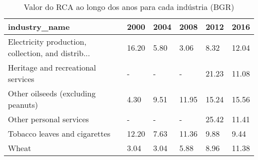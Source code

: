 \begin{table}
\centering
\caption{Valor do RCA ao longo dos anos para cada indústria (BGR)}
\begin{tabular}{p{6cm}p{1.5cm}p{1.5cm}p{1.5cm}p{1.5cm}p{1.5cm}}
\toprule
                                     industry\_name &  2000 & 2004 &  2008 &  2012 &  2016 \\
\midrule
Electricity production, collection, and distrib... & 16.20 & 5.80 &  3.06 &  8.32 & 12.04 \\
                Heritage and recreational services &     - &    - &     - & 21.23 & 11.08 \\
                Other oilseeds (excluding peanuts) &  4.30 & 9.51 & 11.95 & 15.24 & 15.56 \\
                           Other personal services &     - &    - &     - & 25.42 & 11.41 \\
                     Tobacco leaves and cigarettes & 12.20 & 7.63 & 11.36 &  9.88 &  9.44 \\
                                             Wheat &  3.04 & 3.04 &  5.88 &  8.96 & 11.38 \\
\bottomrule
\end{tabular}
\end{table}
